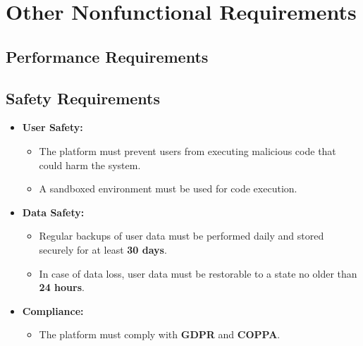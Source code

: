 \documentclass[a4paper, 11pt]{scrreprt}
\begin{document}
\chapter{Other Nonfunctional Requirements}

\section{Performance Requirements}

\section{Safety Requirements}
\begin{itemize}
    \item \textbf{User Safety:}
    \begin{itemize}
        \item The platform must prevent users from executing malicious code that could harm the system.
        \item A sandboxed environment must be used for code execution.
    \end{itemize}

    \item \textbf{Data Safety:}
    \begin{itemize}
        \item Regular backups of user data must be performed daily and stored securely for at least \textbf{30 days}.
        \item In case of data loss, user data must be restorable to a state no older than \textbf{24 hours}.
    \end{itemize}

    \item \textbf{Compliance:}
    \begin{itemize}
        \item The platform must comply with \textbf{GDPR} and \textbf{COPPA}.
    \end{itemize}
\end{itemize}
\end{document}
